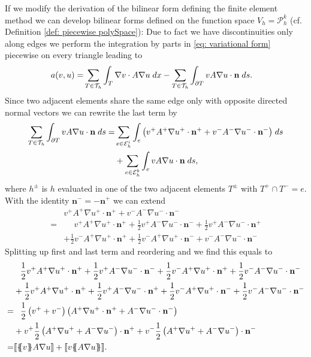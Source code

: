 If we modify the derivation of the bilinear form defining the finite element method we can develop bilinear forms defined on the function space $V_h = \mathcal P_h^k$ (cf. Definition \ref{def: piecewise polySpace}): Due to fact we have discontinuities only along edges we perform the integration by parts in \eqref{eq: variational form} piecewise on every triangle leading to
\begin{align}
	a(v, u) = & \sum_{T \in \mathcal{T}_h} \int_{T} {{\nabla v \cdot A \nabla u }\;dx}
		- \sum_{T \in \mathcal{T}_h} \int_{\partial T} {{ v A \nabla u \cdot \mathbf n}\;ds}.
\end{align}
Since two adjacent elements share the same edge only with opposite directed normal vectors we can rewrite the last term by
\begin{align*}
\sum\limits_{T \in \mathcal{T}_h}\int_{\partial T} {{ v A \nabla u \cdot \mathbf n }\;ds}
= &\sum\limits_{e \in \mathcal{E}_h^i}\int_{e} {{ \left( v^+ A^+ \nabla u^+ \cdot \mathbf n^+ + v^- A^- \nabla u^- \cdot \mathbf n^- \right)}\;ds} \\
& + \sum\limits_{e \in \mathcal{E}_h^b}\int_{e} {{ v A \nabla u \cdot \mathbf n}\;ds},
\end{align*}
where $h^\pm $ is $h$ evaluated in one of the two adjacent elements $T^\pm$ with $T^+ \cap T^- = e$. With the identity $\mathbf n^- = -\mathbf n^+$ we can extend
\begin{align*}
	&v^+ A^+ \nabla u^+ \cdot \mathbf n^+ + v^- A^- \nabla u^- \cdot \mathbf n^- \\
		= & \phantom{+} v^+ A^+ \nabla u^+ \cdot \mathbf n^+ 
		     + \frac 1 2  v^+ A^- \nabla u^- \cdot \mathbf n^- + \frac 1 2 v^+ A^- \nabla u^- \cdot \mathbf n^+ \\
		& + \frac 1 2  v^- A^+ \nabla u^+ \cdot \mathbf n^+ + \frac 1 2 v^- A^+ \nabla u^+ \cdot \mathbf n^-
		   + v^- A^- \nabla u^- \cdot \mathbf n^-
\end{align*}
Splitting up first and last term and reordering and we find this equals to
\begin{align*}
		 & \phantom{+} \frac 1 2 v^+ A^+ \nabla u^+ \cdot \mathbf n^+ 
		     + \frac 1 2  v^+ A^- \nabla u^- \cdot \mathbf n^- + \frac 1 2  v^- A^+ \nabla u^+ \cdot \mathbf n^+ + \frac 1 2 v^- A^- \nabla u^- \cdot \mathbf n^- \\
		& + \frac 1 2  v^+ A^+ \nabla u^+ \cdot \mathbf n^+  + \frac 1 2 v^+ A^- \nabla u^- \cdot \mathbf n^+ +\frac 1 2 v^- A^+ \nabla u^+ \cdot \mathbf n^- + \frac 1 2 v^- A^- \nabla u^- \cdot \mathbf n^-\\
		    	  = & \phantom{+} \frac 1 2 \left(v^+ + v^- \right) \left(A^+ \nabla u^+ \cdot \mathbf n^+ + A^- \nabla u^- \cdot \mathbf n^- \right) \\
  &+  v^+ \frac 1 2  \left(A^+ \nabla u^+ + A^- \nabla u^-\right) \cdot \mathbf n^+ + v^- \frac 1 2 \left(A^+ \nabla u^+ + A^- \nabla u^-\right) \cdot \mathbf n^- \\
  = &  \jump {\average v  A \nabla u}+ \jump {v \average{ A \nabla u}}.
\end{align*}
